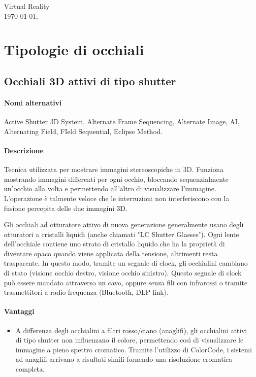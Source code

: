 \documentclass[8pt]{extarticle}
\begin{document}
\begin{multicols}{3}
\noindent
\large Virtual Reality
\normalsize \\
\today, \currenttime

\section{Tipologie di occhiali}
\subsection{Occhiali 3D attivi di tipo shutter}
\paragraph{Nomi alternativi} Active Shutter 3D System, Alternate Frame Sequencing, Alternate Image,
AI, Alternating Field, FIeld Sequential, Eclipse Method.

\paragraph{Descrizione} Tecnica utilizzata per mostrare immagini stereoscopiche in 3D.
Funziona mostrando immagini differenti per ogni occhio, bloccando sequenzialmente un'occhio alla volta
e permettendo all'altro di visualizzare l'immagine. L'operazione è talmente veloce che le interruzioni
non interferiscono con la fusione percepita delle due immagini 3D.

Gli occhiali ad otturatore attivo di nuova generazione generalmente usano degli otturatori a cristalli
liquidi (anche chiamati "LC Shutter Glasses"). Ogni lente dell'occhiale contiene uno strato di
cristallo liquido che ha la proprietà di diventare opaco quando viene applicata della tensione,
altrimenti resta trasparente. In questo modo, tramite un segnale di clock, gli occhialini
cambiano di stato (visione occhio destro, visione occhio sinistro). Questo segnale di clock può
essere mandato attraverso un cavo, oppure senza fili con infrarossi o tramite
trasmettitori a radio frequenza (Bluetooth, DLP link).

\paragraph{Vantaggi} 
\begin{itemize}
    \item A differenza degli occhialini a filtri rosso/ciano (anaglifi), gli occhialini
    attivi di tipo shutter non influenzano il colore, permettendo così di visualizzare le
    immagine a pieno spettro cromatico. Tramite l'utilizzo di ColorCode, i sistemi ad anaglifi
    arrivano a risultati simili fornendo una risoluzione cromatica completa.


\end{itemize}
\end{multicols}
\end{document}
